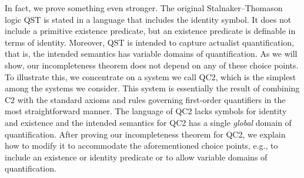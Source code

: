 \documentclass[12pt]{article}
\begin{document}
In fact, we prove something even stronger. 
The original Stalnaker--Thomason logic \textsf{QST} is stated in a language that includes the identity symbol. 
It does not include a primitive existence predicate, but an existence predicate is definable in terms of identity. 
Moreover, \textsf{QST} is intended to capture actualist quantification, that is, the intended semantics has variable domains of quantification. 
As we will show, our incompleteness theorem does not depend on any of these choice points. 
To illustrate this, we concentrate on a system we call \textsf{QC2}, which is the simplest among the systems we consider. 
This system is essentially the result of combining \textsf{C2} with the standard axioms and rules governing first-order quantifiers in the most straightforward manner. 
The language of \textsf{QC2} lacks symbols for identity and existence and the intended semantics for \textsf{QC2} has a single \emph{global} domain of quantification. 
After proving our incompleteness theorem for \textsf{QC2}, we explain how to modify it to accommodate the aforementioned choice points, e.g., to include an existence or identity predicate or to allow variable domains of quantification.

\end{document}
